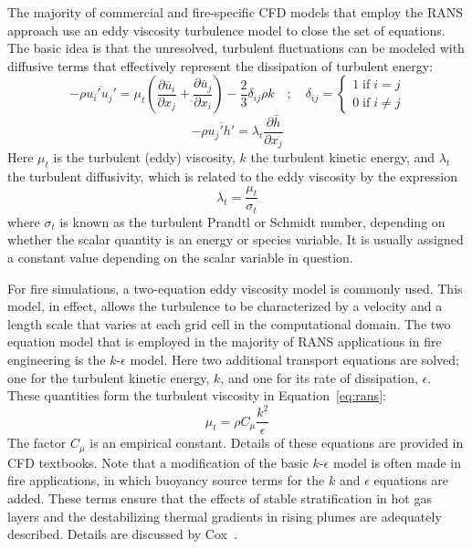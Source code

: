 \documentclass[graybox]{svmult}
\begin{document}
The majority of commercial and fire-specific CFD models that employ the RANS approach use an eddy viscosity turbulence model to close the set of equations. The basic idea is that the unresolved, turbulent fluctuations can be modeled with diffusive terms that effectively represent the dissipation of turbulent energy:
\begin{equation}
-\rho \overline{ u_i' u_j' } = \mu_t \left( \frac{\partial \bar{u}_i}{\partial x_j} + \frac{\partial \bar{u}_j}{\partial x_i} \right) - \frac{2}{3} \delta_{ij} \rho k \quad ; \quad \delta_{ij} = \left\{ \begin{array}{l} 1 \; \mathrm{if} \; i=j \\ 0 \; \mathrm{if} \; i\neq j \end{array} \right.
\label{eq:rans}
\end{equation}
\begin{equation}
-\rho \overline{ u_j' h' } = \lambda_t \frac{\partial \bar{h}}{\partial x_j}
\end{equation}
Here  $\mu_t$ is the turbulent (eddy) viscosity, $k$ the turbulent kinetic energy, and $\lambda_t$ the turbulent diffusivity, which is related to the eddy viscosity by the expression
\begin{equation}
\lambda_t = \frac{\mu_t}{\sigma_t}
\end{equation}
where $\sigma_t$ is known as the turbulent Prandtl or Schmidt number, depending on whether the scalar quantity is an energy or species variable. It is usually assigned a constant value depending on the scalar variable in question.

For fire simulations, a two-equation eddy viscosity model is commonly used. This model, in effect, allows the turbulence to be characterized by a velocity and a length scale that varies at each grid cell in the computational domain. The two equation model that is employed in the majority of RANS applications in fire engineering is the $k$-$\epsilon$  model. Here two additional transport equations are solved; one for the turbulent kinetic energy, $k$, and one for its rate of dissipation, $\epsilon$. These quantities form the turbulent viscosity in Equation~\ref{eq:rans}:
\begin{equation}
\mu_t = \rho C_\mu \frac{k^2}{\epsilon}
\label{eq:mudef}
\end{equation}
The factor $C_\mu$ is an empirical constant. Details of these equations are provided in CFD textbooks. Note that a modification of the basic $k$-$\epsilon$ model is often made in fire applications, in which buoyancy source terms for the $k$ and $\epsilon$ equations are added. These terms ensure that the effects of stable stratification in hot gas layers and the destabilizing thermal gradients in rising plumes are adequately described. Details are discussed by Cox~\cite{Cox:1998}.
\end{document}
